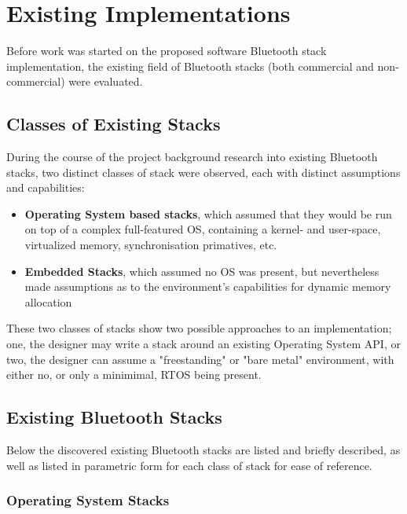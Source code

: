 \chapter{Existing Implementations}
\label{Chapter 2}

Before work was started on the proposed software Bluetooth stack implementation, the existing field of Bluetooth stacks (both commercial and non-commercial) were evaluated.

\section{Classes of Existing Stacks}

During the course of the project background research into existing Bluetooth stacks, two distinct classes of stack were observed, each with distinct assumptions and capabilities:

\begin{itemize}
	\item \textbf{Operating System based stacks}, which assumed that they would be run on top of a complex full-featured OS, containing a kernel- and user-space, virtualized memory, synchronisation primatives, etc.
	\item \textbf{Embedded Stacks}, which assumed no OS was present, but nevertheless made assumptions as to the environment's capabilities for dynamic memory allocation
\end{itemize}

These two classes of stacks show two possible approaches to an implementation; one, the designer may write a stack around an existing Operating System API, or two, the designer can assume a "freestanding" or "bare metal" environment, with either no, or only a minimimal, RTOS being present.

\section{Existing Bluetooth Stacks}

Below the discovered existing Bluetooth stacks are listed and briefly described, as well as listed in parametric form for each class of stack for ease of reference.

\subsection{Operating System Stacks}

